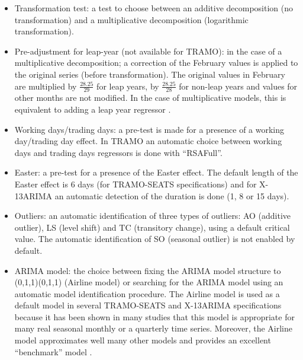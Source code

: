 \documentclass[article]{jss}
\providecommand{\tightlist}{%
  \setlength{\itemsep}{0pt}\setlength{\parskip}{0pt}}
\begin{document}
\begin{itemize}
\tightlist
\item
  Transformation test: a test to choose between an additive
  decomposition (no transformation) and a multiplicative decomposition
  (logarithmic transformation).\\
\item
  Pre-adjustment for leap-year (not available for TRAMO): in the case of
  a multiplicative decomposition; a correction of the February values is
  applied to the original series (before transformation). The original
  values in February are multiplied by \(\frac{28.25}{29}\) for leap
  years, by \(\frac{28.25}{28}\) for non-leap years and values for other
  months are not modified. In the case of multiplicative models, this is
  equivalent to adding a leap year regressor
  \citep{bell1992lengthmonthadj}.\\
\item
  Working days/trading days: a pre-test is made for a presence of a
  working day/trading day effect. In TRAMO an automatic choice between
  working days and trading days regressors is done with ``RSAFull''.\\
\item
  Easter: a pre-test for a presence of the Easter effect. The default
  length of the Easter effect is 6 days (for TRAMO-SEATS specifications)
  and for X-13ARIMA an automatic detection of the duration is done (1, 8
  or 15 days).\\
\item
  Outliers: an automatic identification of three types of outliers: AO
  (additive outlier), LS (level shift) and TC (transitory change), using
  a default critical value. The automatic identification of SO (seasonal
  outlier) is not enabled by default.\\
\item
  ARIMA model: the choice between fixing the ARIMA model structure to
  (0,1,1)(0,1,1) (Airline model) or searching for the ARIMA model using
  an automatic model identification procedure. The Airline model is used
  as a default model in several TRAMO-SEATS and X-13ARIMA specifications
  because it has been shown in many studies that this model is
  appropriate for many real seasonal monthly or a quarterly time series.
  Moreover, the Airline model approximates well many other models and
  provides an excellent ``benchmark'' model
  \citep{maravall2009identification}.
\end{itemize}
\end{document}
